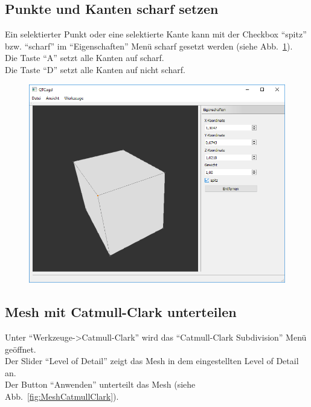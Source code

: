 \subsection{Punkte und Kanten scharf setzen}
Ein selektierter Punkt oder eine selektierte Kante kann mit der Checkbox "`spitz"' bzw. "`scharf"' im "`Eigenschaften"' Menü scharf gesetzt werden (siehe Abb.~\ref{fig:Punkte-KantenScharfSetzen}).\\
Die Taste "`A"' setzt alle Kanten auf scharf.\\
Die Taste "`D"' setzt alle Kanten auf nicht scharf.\\

\begin{figure}[H]
	\centering
	\includegraphics[scale=0.5]{content/pictures/7-Punkte-KantenScharfSetzen}
	\caption{}
	\label{fig:Punkte-KantenScharfSetzen}
\end{figure}

\subsection{Mesh mit Catmull-Clark unterteilen}
Unter "`Werkzeuge->Catmull-Clark"' wird das "`Catmull-Clark Subdivision"' Menü geöffnet.\\
Der Slider "`Level of Detail"' zeigt das Mesh in dem eingestellten Level of Detail an.\\
Der Button "`Anwenden"' unterteilt das Mesh (siehe Abb.~\ref{fig:MeshCatmullClark}).

